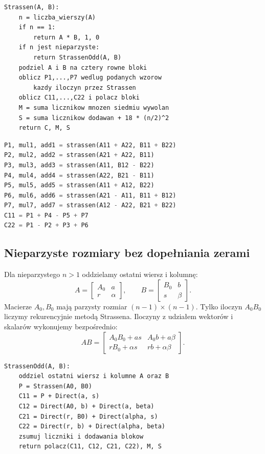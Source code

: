 \documentclass[11pt,a4paper]{article}
\begin{document}
\begin{lstlisting}[caption={Pseudokod Strassena dla dowolnego dodatniego rozmiaru kwadratowego.}]
Strassen(A, B):
    n = liczba_wierszy(A)
    if n == 1:
        return A * B, 1, 0
    if n jest nieparzyste:
        return StrassenOdd(A, B)
    podziel A i B na cztery rowne bloki
    oblicz P1,...,P7 wedlug podanych wzorow
        kazdy iloczyn przez Strassen
    oblicz C11,...,C22 i polacz bloki
    M = suma licznikow mnozen siedmiu wywolan
    S = suma licznikow dodawan + 18 * (n/2)^2
    return C, M, S
\end{lstlisting}

\begin{lstlisting}[language=Python,caption={Fragment implementacji siedmiu iloczynów.}]
P1, mul1, add1 = strassen(A11 + A22, B11 + B22)
P2, mul2, add2 = strassen(A21 + A22, B11)
P3, mul3, add3 = strassen(A11, B12 - B22)
P4, mul4, add4 = strassen(A22, B21 - B11)
P5, mul5, add5 = strassen(A11 + A12, B22)
P6, mul6, add6 = strassen(A21 - A11, B11 + B12)
P7, mul7, add7 = strassen(A12 - A22, B21 + B22)
C11 = P1 + P4 - P5 + P7
C22 = P1 - P2 + P3 + P6
\end{lstlisting}

\subsection{Nieparzyste rozmiary bez dopełniania zerami}
Dla nieparzystego $n>1$ oddzielamy ostatni wiersz i kolumnę:
\[
A=\begin{bmatrix}A_0&a\\r&\alpha\end{bmatrix},\qquad
B=\begin{bmatrix}B_0&b\\s&\beta\end{bmatrix}.
\]
Macierze $A_0,B_0$ mają parzysty rozmiar $(n-1)\times(n-1)$.
Tylko iloczyn $A_0B_0$ liczymy rekurencyjnie metodą Strassena.
Iloczyny z udziałem wektorów i skalarów wykonujemy bezpośrednio:
\[
AB=\begin{bmatrix}
 A_0B_0+as & A_0b+a\beta\\
 rB_0+\alpha s & rb+\alpha\beta
\end{bmatrix}.
\]

\begin{lstlisting}[caption={Pseudokod obsługi nieparzystego rozmiaru.}]
StrassenOdd(A, B):
    oddziel ostatni wiersz i kolumne A oraz B
    P = Strassen(A0, B0)
    C11 = P + Direct(a, s)
    C12 = Direct(A0, b) + Direct(a, beta)
    C21 = Direct(r, B0) + Direct(alpha, s)
    C22 = Direct(r, b) + Direct(alpha, beta)
    zsumuj liczniki i dodawania blokow
    return polacz(C11, C12, C21, C22), M, S
\end{lstlisting}
\end{document}
